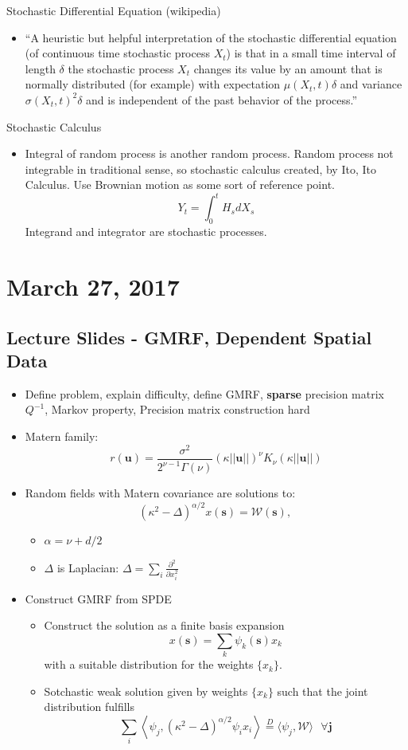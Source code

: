 \documentclass{article}
\begin{document}
Stochastic Differential Equation (wikipedia)
\begin{itemize}
\item ``A heuristic but helpful interpretation of the stochastic differential equation (of continuous time stochastic process $X_{t}$) is that in a small time interval of length $\delta$ the stochastic process $X_{t}$ changes its value by an amount that is normally distributed (for example) with expectation $\mu(X_{t},t)\delta$ and variance $\sigma(X_{t}, t)^{2}\delta$ and is independent of the past behavior of the process.''
\end{itemize}
Stochastic Calculus \citep{Mao2007}
\begin{itemize}
\item Integral of random process is another random process. Random process not integrable in traditional sense, so stochastic calculus created, by Ito, Ito Calculus. Use Brownian motion as some sort of reference point.
$$ Y_{t} = \int_{0}^{t} H_{s} dX_{s} $$
Integrand and integrator are stochastic processes.
\end{itemize}

\section*{March 27, 2017}

\subsection*{Lecture Slides - GMRF, Dependent Spatial Data}
\citep{Lindstrom2011}
\begin{itemize}
\item Define problem, explain difficulty, define GMRF, {\bf sparse} precision matrix $Q^{-1}$, Markov property, Precision matrix construction hard
\item  Matern family:
 $$r(\pmb{u}) = \frac{\sigma^{2}}{2^{\nu - 1}\Gamma(\nu)}(\kappa||\pmb{u}||)^{\nu}K_{\nu}(\kappa||\pmb{u}||)$$
\item Random fields with Matern covariance are solutions to:
$$ (\kappa^{2} - \Delta)^{\alpha/2}x(\pmb{s}) = \mathcal{W}(\pmb{s})\text{, } $$
      \begin{itemize}
      \item $\alpha = \nu + d/2$
      \item $\Delta$ is Laplacian: $ \Delta = \sum_{i} \frac{\partial^{2}}{\partial x_{i}^{2}} $
      \end{itemize}
\item Construct GMRF from SPDE
      \begin{itemize}
      \item Construct the solution as a finite basis expansion
      $$ x(\pmb{s}) = \sum_{k} \psi_{k}(\pmb{s})x_{k}$$ 
      with a suitable distribution for the weights $\{x_{k}\}$.
      \item Sotchastic weak solution given by weights $\{x_{k}\}$ such that the joint distribution fulfills
      $$ \sum_{i} \left< \psi_{j}, (\kappa^{2} - \Delta)^{\alpha/2} \psi_{i} x_{i} \right> \overset{D}{=} \langle \psi_{j}, \mathcal{W} \rangle \text{  } \forall \pmb{j}$$
      \end{itemize}
\end{itemize}
\end{document}
